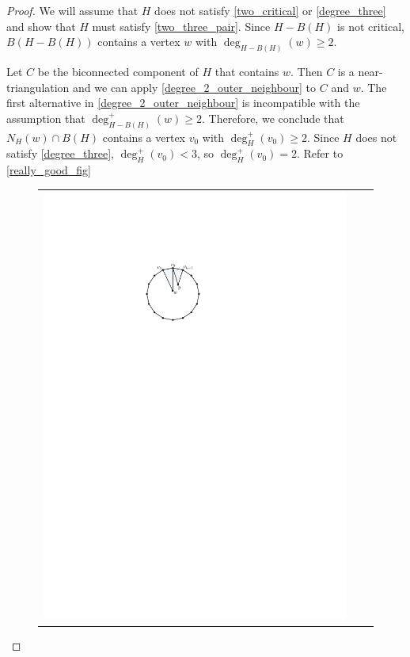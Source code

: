\documentclass[12pt]{article}
\theoremstyle{definition}
\begin{document}
\begin{proof}
  We will assume that $H$ does not satisfy \cref{two_critical} or \cref{degree_three} and show that $H$ must satisfy \cref{two_three_pair}.  Since $H-B(H)$ is not critical, $B(H-B(H))$ contains a vertex $w$ with $\deg_{H-B(H)}(w)\ge 2$.

  Let $C$ be the biconnected component of $H$ that contains $w$.  Then $C$ is a near-triangulation and we can apply \cref{degree_2_outer_neighbour} to $C$ and $w$. The first alternative in \cref{degree_2_outer_neighbour} is incompatible with the assumption that $\deg^+_{H-B(H)}(w)\ge 2$.  Therefore, we conclude that $N_H(w)\cap B(H)$ contains a vertex $v_0$ with $\deg^+_H(v_0)\ge 2$.  Since $H$ does not satisfy \cref{degree_three}, $\deg^+_H(v_0)< 3$, so $\deg^+_H(v_0)=2$.  Refer to \cref{really_good_fig}
  \begin{figure}
    \centering
    \begin{tabular}{ccc}
      \includegraphics[page=1]{figs/really_good} &

\end{tabular}
\end{figure}
\end{proof}
\end{document}
